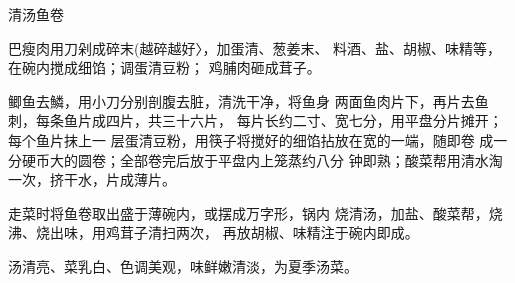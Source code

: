 \begin{recipe}{清汤鱼卷}

\ingredients


\cooking

巴瘦肉用刀剁成碎末(越碎越好〉，加蛋清、葱姜末、 料酒、盐、胡椒、味精等，在碗内搅成细馅；调蛋清豆粉； 鸡脯肉砸成茸子。

\step 	鲫鱼去鱗，用小刀分别剖腹去脏，清洗干净，将鱼身 两面鱼肉片下，再片去鱼刺，每条鱼片成四片，共三十六片， 每片长约二寸、宽七分，用平盘分片摊开；每个鱼片抹上一 层蛋清豆粉，用筷子将搅好的细馅拈放在宽的一端，随即卷 成一分硬币大的圆卷；全部卷完后放于平盘内上笼蒸约八分 钟即熟；酸菜帮用清水淘一次，挤干水，片成薄片。

\step 	走菜时将鱼卷取出盛于薄碗内，或摆成万字形，锅内 烧清汤，加盐、酸菜帮，烧沸、烧出味，用鸡茸子清扫两次， 再放胡椒、味精注于碗内即成。

\notes

汤清亮、菜乳白、色调美观，味鲜嫩清淡，为夏季汤菜。

\end{recipe}

